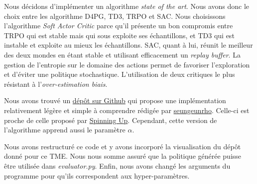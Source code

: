 Nous décidons d'implémenter un algorithme \emph{state of the art}. Nous avons donc le choix entre les algorithme D4PG, TD3, TRPO et SAC. Nous choisissons l'algorithme \emph{Soft Actor Critic} parce qu'il présente un bon compromis entre TRPO qui est stable mais qui sous exploite ses échantillons, et TD3 qui est instable et exploite au mieux les échantillons. SAC, quant à lui, réunit le meilleur des deux mondes en étant stable et utilisant efficacement un \emph{replay buffer}. La gestion de l'entropie sur le domaine des actions permet de favoriser l'exploration et d'éviter une politique stochastique. L'utilisation de deux critiques le plus résistant à l'\emph{over-estimation biais}.

Nous avons trouvé un \href{https://github.com/seungeunrho/minimalRL/blob/master/sac.py}{dépôt sur Github} qui propose une implémentation relativement légère et simple à comprendre rédigée par \href{https://github.com/seungeunrho}{seungeunrho}. Celle-ci est proche de celle proposé par \href{https://spinningup.openai.com/en/latest/algorithms/sac.html}{Spinning Up}. Cependant, cette version de l'algorithme apprend aussi le paramètre $\alpha$.

Nous avons restructuré ce code et y avons incorporé la visualisation du dépôt donné pour ce TME. Nous nous somme assuré que la politique générée puisse être utilisée dans \emph{evaluator.py}. Enfin, nous avons changé les arguments du programme pour qu'ils correspondent aux hyper-paramètres.